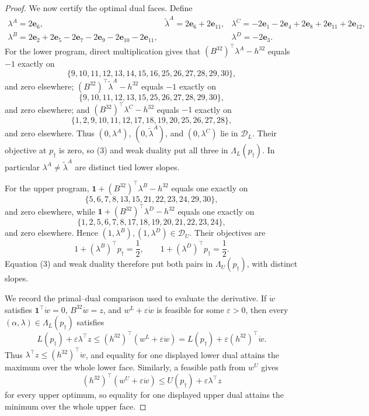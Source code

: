 \documentclass{article}
\begin{document}
\begin{proof}
We now certify the optimal dual faces.  Define
\[
\begin{array}{lll}
\lambda^A=2\mathbf e_6,
&\widetilde\lambda^A=2\mathbf e_6+2\mathbf e_{11},
&\lambda^C=-2\mathbf e_1-2\mathbf e_4+2\mathbf e_8+2\mathbf e_{11}+2\mathbf e_{12},\\
\lambda^B=2\mathbf e_2+2\mathbf e_5-2\mathbf e_7-2\mathbf e_9-2\mathbf e_{10}-2\mathbf e_{11},
&&\lambda^D=-2\mathbf e_3.
\end{array}
\tag{11}
\]
For the lower program, direct multiplication gives that \((B^{32})^{\top}\lambda^A-h^{32}\) equals \(-1\) exactly on
\[
\{9,10,11,12,13,14,15,16,25,26,27,28,29,30\},
\tag{12}
\]
and zero elsewhere; \((B^{32})^{\top}\widetilde\lambda^A-h^{32}\) equals \(-1\) exactly on
\[
\{9,10,11,12,13,15,25,26,27,28,29,30\},
\tag{13}
\]
and zero elsewhere; and \((B^{32})^{\top}\lambda^C-h^{32}\) equals \(-1\) exactly on
\[
\{1,2,9,10,11,12,17,18,19,20,25,26,27,28\},
\tag{14}
\]
and zero elsewhere.  Thus \((0,\lambda^A)\), \((0,\widetilde\lambda^A)\), and \((0,\lambda^C)\) lie in \(\mathcal D_L\).  Their objective at \(p_\dagger\) is zero, so (3) and weak duality put all three in \(\Lambda_L(p_\dagger)\).  In particular \(\lambda^A\neq\widetilde\lambda^A\) are distinct tied lower slopes.

For the upper program, \(\mathbf 1+(B^{32})^{\top}\lambda^B-h^{32}\) equals one exactly on
\[
\{5,6,7,8,13,15,21,22,23,24,29,30\},
\tag{15}
\]
and zero elsewhere, while \(\mathbf 1+(B^{32})^{\top}\lambda^D-h^{32}\) equals one exactly on
\[
\{1,2,5,6,7,8,17,18,19,20,21,22,23,24\},
\tag{16}
\]
and zero elsewhere.  Hence \((1,\lambda^B),(1,\lambda^D)\in\mathcal D_U\).  Their objectives are
\[
1+(\lambda^B)^{\top}p_\dagger=\frac12,
\qquad
1+(\lambda^D)^{\top}p_\dagger=\frac12.
\tag{17}
\]
Equation (3) and weak duality therefore put both pairs in \(\Lambda_U(p_\dagger)\), with distinct slopes.

We record the primal--dual comparison used to evaluate the derivative.  If \(\dot w\) satisfies \(\mathbf 1^{\top}\dot w=0\), \(B^{32}\dot w=z\), and \(w^L+\varepsilon\dot w\) is feasible for some \(\varepsilon>0\), then every \((\alpha,\lambda)\in\Lambda_L(p_\dagger)\) satisfies
\[
L(p_\dagger)+\varepsilon\lambda^{\top}z
\leq(h^{32})^{\top}(w^L+\varepsilon\dot w)
=L(p_\dagger)+\varepsilon(h^{32})^{\top}\dot w.
\tag{18}
\]
Thus \(\lambda^{\top}z\leq(h^{32})^{\top}\dot w\), and equality for one displayed lower dual attains the maximum over the whole lower face.  Similarly, a feasible path from \(w^U\) gives
\[
(h^{32})^{\top}(w^U+\varepsilon\dot w)
\leq U(p_\dagger)+\varepsilon\lambda^{\top}z
\tag{19}
\]
for every upper optimum, so equality for one displayed upper dual attains the minimum over the whole upper face.


\end{proof}
\end{document}
